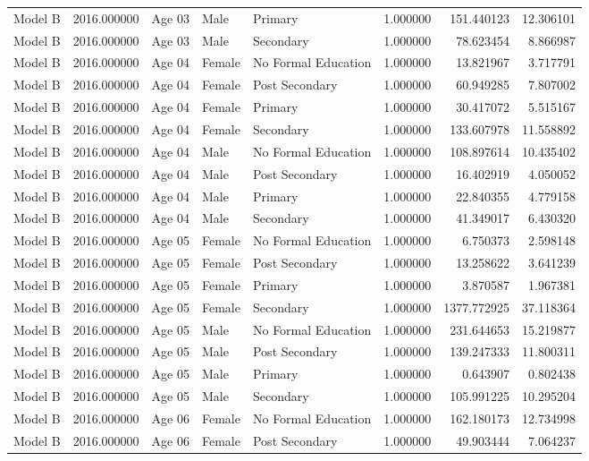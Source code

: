 \begin{table}[ht]
\begin{tabular}{lrlllrrr}
Model B & 2016.000000 & Age 03 & Male & Primary & 1.000000 & 151.440123 & 12.306101 \\
Model B & 2016.000000 & Age 03 & Male & Secondary & 1.000000 & 78.623454 & 8.866987 \\
Model B & 2016.000000 & Age 04 & Female & No Formal Education & 1.000000 & 13.821967 & 3.717791 \\
Model B & 2016.000000 & Age 04 & Female & Post Secondary & 1.000000 & 60.949285 & 7.807002 \\
Model B & 2016.000000 & Age 04 & Female & Primary & 1.000000 & 30.417072 & 5.515167 \\
Model B & 2016.000000 & Age 04 & Female & Secondary & 1.000000 & 133.607978 & 11.558892 \\
Model B & 2016.000000 & Age 04 & Male & No Formal Education & 1.000000 & 108.897614 & 10.435402 \\
Model B & 2016.000000 & Age 04 & Male & Post Secondary & 1.000000 & 16.402919 & 4.050052 \\
Model B & 2016.000000 & Age 04 & Male & Primary & 1.000000 & 22.840355 & 4.779158 \\
Model B & 2016.000000 & Age 04 & Male & Secondary & 1.000000 & 41.349017 & 6.430320 \\
Model B & 2016.000000 & Age 05 & Female & No Formal Education & 1.000000 & 6.750373 & 2.598148 \\
Model B & 2016.000000 & Age 05 & Female & Post Secondary & 1.000000 & 13.258622 & 3.641239 \\
Model B & 2016.000000 & Age 05 & Female & Primary & 1.000000 & 3.870587 & 1.967381 \\
Model B & 2016.000000 & Age 05 & Female & Secondary & 1.000000 & 1377.772925 & 37.118364 \\
Model B & 2016.000000 & Age 05 & Male & No Formal Education & 1.000000 & 231.644653 & 15.219877 \\
Model B & 2016.000000 & Age 05 & Male & Post Secondary & 1.000000 & 139.247333 & 11.800311 \\
Model B & 2016.000000 & Age 05 & Male & Primary & 1.000000 & 0.643907 & 0.802438 \\
Model B & 2016.000000 & Age 05 & Male & Secondary & 1.000000 & 105.991225 & 10.295204 \\
Model B & 2016.000000 & Age 06 & Female & No Formal Education & 1.000000 & 162.180173 & 12.734998 \\
Model B & 2016.000000 & Age 06 & Female & Post Secondary & 1.000000 & 49.903444 & 7.064237 \\

\end{tabular}
\end{table}
